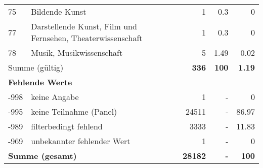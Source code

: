 \begin{longtable}{lXrrr}
        75 & \multicolumn{1}{X}{Bildende Kunst} & %
          \num{1} &
          \num[round-mode=places,round-precision=2]{0.3} &
          \num[round-mode=places,round-precision=2]{0} \\

        77 & \multicolumn{1}{X}{Darstellende Kunst, Film und Fernsehen, Theaterwissenschaft} & %
          \num{1} &
          \num[round-mode=places,round-precision=2]{0.3} &
          \num[round-mode=places,round-precision=2]{0} \\

        78 & \multicolumn{1}{X}{Musik, Musikwissenschaft} & %
          \num{5} &
          \num[round-mode=places,round-precision=2]{1.49} &
          \num[round-mode=places,round-precision=2]{0.02} \\

     \midrule
     \multicolumn{2}{l}{Summe (gültig)} &
       \textbf{\num{336}} &
     \textbf{\num{100}} &
       \textbf{\num[round-mode=places,round-precision=2]{1.19}} \\
     \multicolumn{5}{l}{\textbf{Fehlende Werte}}\\
       -998 &
       keine Angabe &
         \num{1} &
        - &
         \num[round-mode=places,round-precision=2]{0} \\
       -995 &
       keine Teilnahme (Panel) &
         \num{24511} &
        - &
         \num[round-mode=places,round-precision=2]{86.97} \\
       -989 &
       filterbedingt fehlend &
         \num{3333} &
        - &
         \num[round-mode=places,round-precision=2]{11.83} \\
       -969 &
       unbekannter fehlender Wert &
         \num{1} &
        - &
         \num[round-mode=places,round-precision=2]{0} \\
     \midrule
     \multicolumn{2}{l}{\textbf{Summe (gesamt)}} &
          \textbf{\num{28182}} &
        \textbf{-} &
        \textbf{\num{100}} \\
     \bottomrule
     \end{longtable}
     
